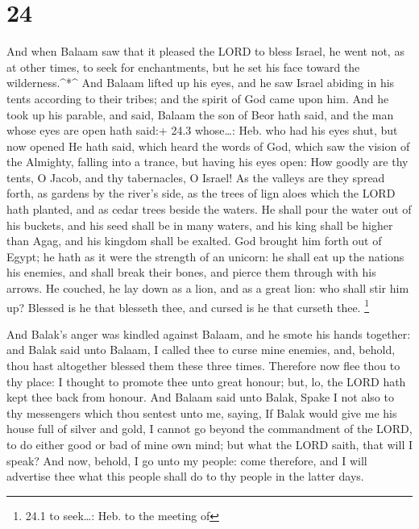 \hypertarget{section-23}{%
\section{24}\label{section-23}}

 And when Balaam saw that it pleased the LORD to bless
Israel, he went not, as at other times, to seek for enchantments, but he
set his face toward the wilderness.\^{}*\^{}  And Balaam
lifted up his eyes, and he saw Israel abiding in his tents according to
their tribes; and the spirit of God came upon him.  And he
took up his parable, and said, Balaam the son of Beor hath said, and the
man whose eyes are open hath said:+ 24.3 whose\ldots: Heb. who had his
eyes shut, but now opened  He hath said, which heard the
words of God, which saw the vision of the Almighty, falling into a
trance, but having his eyes open:  How goodly are thy tents,
O Jacob, and thy tabernacles, O Israel!  As the valleys are
they spread forth, as gardens by the river's side, as the trees of lign
aloes which the LORD hath planted, and as cedar trees beside the waters.
 He shall pour the water out of his buckets, and his seed
shall be in many waters, and his king shall be higher than Agag, and his
kingdom shall be exalted.  God brought him forth out of
Egypt; he hath as it were the strength of an unicorn: he shall eat up
the nations his enemies, and shall break their bones, and pierce them
through with his arrows.  He couched, he lay down as a lion,
and as a great lion: who shall stir him up? Blessed is he that blesseth
thee, and cursed is he that curseth thee. \footnote{24.1 to seek\ldots:
  Heb. to the meeting of}

 And Balak's anger was kindled against Balaam, and he smote
his hands together: and Balak said unto Balaam, I called thee to curse
mine enemies, and, behold, thou hast altogether blessed them these three
times.  Therefore now flee thou to thy place: I thought to
promote thee unto great honour; but, lo, the LORD hath kept thee back
from honour.  And Balaam said unto Balak, Spake I not also
to thy messengers which thou sentest unto me, saying,  If
Balak would give me his house full of silver and gold, I cannot go
beyond the commandment of the LORD, to do either good or bad of mine own
mind; but what the LORD saith, that will I speak?  And now,
behold, I go unto my people: come therefore, and I will advertise thee
what this people shall do to thy people in the latter days.

